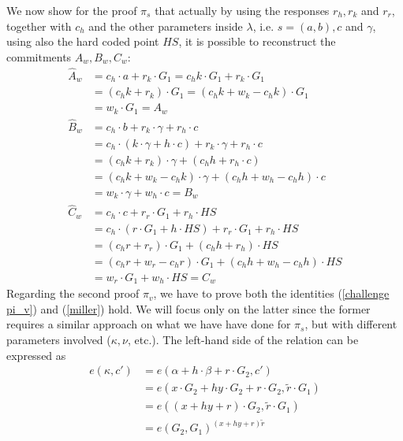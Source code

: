 \documentclass[twocolumn]{article}
\begin{document}
We now show for the proof $\pi_s$ that actually by using the responses $r_h, r_k$ and $r_r$, together with $c_h$ and the other parameters inside $\lambda$, i.e. $s=(a,b), c$ and $\gamma$, using also the hard coded point $HS$, it is possible to reconstruct the commitments $A_w, B_w, C_w$:
\begin{align*}
    \widehat{A}_w   &= c_h\cdot a + r_k\cdot G_1 = c_h k \cdot G_1 + r_k \cdot G_1 \\
                    &= (c_h k + r_k)\cdot G_1 = (c_h k + w_k - c_h k)\cdot G_1 \\
                    &= w_k\cdot G_1 = A_w \\
    \widehat{B}_w   &= c_h\cdot b + r_k\cdot \gamma + r_h\cdot c \\
                    &= c_h\cdot (k\cdot \gamma + h\cdot c) + r_k\cdot\gamma + r_h\cdot c \\
                    &= (c_h k + r_k) \cdot\gamma + (c_h h + r_h\cdot c) \\
                    &= (c_h k + w_k - c_h k ) \cdot\gamma + (c_h h + w_h - c_h h)\cdot c \\
                    &= w_k\cdot\gamma + w_h\cdot c = B_w \\
    \widehat{C}_w   &= c_h\cdot c + r_r\cdot G_1 + r_h\cdot HS \\
                    &= c_h\cdot (r\cdot G_1 + h\cdot HS) + r_r\cdot G_1 + r_h\cdot HS \\
                    &= (c_h r + r_r)\cdot G_1 + (c_h h + r_h)\cdot HS \\
                    &= (c_h r + w_r - c_h r)\cdot G_1 + (c_h h + w_h - c_h h)\cdot HS \\
                    &= w_r \cdot G_1 + w_h\cdot HS = C_w
\end{align*} 
Regarding the second proof $\pi_v$, we have to prove both the identities (\ref{challenge pi_v}) and (\ref{miller}) hold. We will focus only on the latter since the former requires a similar approach on what we have have done for $\pi_s$, but with different parameters involved ($\kappa, \nu$, etc.). The left-hand side of the relation can be expressed as
\begin{align*}
    e(\kappa, c') &= e(\alpha + h\cdot\beta + r\cdot G_2, c') \\
    &= e(x\cdot G_2 + hy\cdot G_2  + r\cdot G_2,\tilde{r}\cdot G_1) \\
    &= e((x+hy+r)\cdot G_2, \tilde{r}\cdot G_1) \\
    &= e(G_2,G_1)^{(x+hy+r)\tilde{r}}
\end{align*}
\end{document}
